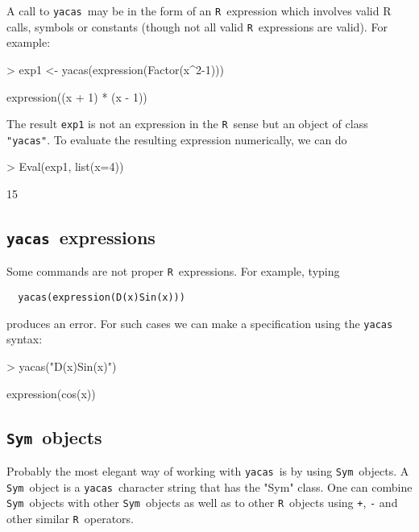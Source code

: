 \documentclass[]{article}
\newcommand{\yacas}{{\tt yacas}}
\newcommand{\code}[1]{{\tt #1}}
\def\R{\texttt{R}}
\def\sym{\texttt{Sym}}
\begin{document}
A call to \yacas\ may be in the form of an \R\ expression which
involves valid R calls, symbols or constants (though not all valid \R\
expressions are valid). For example:
\begin{Schunk}
\begin{Sinput}
> exp1 <- yacas(expression(Factor(x^2-1)))
\end{Sinput}
\begin{Soutput}
expression((x + 1) * (x - 1))
\end{Soutput}
\end{Schunk}

The result \code{exp1} is not an expression in the \R\ sense but an
object of class \code{"yacas"}. 
To evaluate the resulting expression numerically, we can do
\begin{Schunk}
\begin{Sinput}
> Eval(exp1, list(x=4))
\end{Sinput}
\begin{Soutput}
[1] 15
\end{Soutput}
\end{Schunk}

\subsection{\yacas\ expressions}

Some commands are not proper \R\ expressions. For example, 
typing 
\begin{verbatim}
  yacas(expression(D(x)Sin(x)))
\end{verbatim}
produces an error. 
For such cases we can make
a specification using the \yacas{} syntax:
\begin{Schunk}
\begin{Sinput}
> yacas("D(x)Sin(x)")
\end{Sinput}
\begin{Soutput}
expression(cos(x))
\end{Soutput}
\end{Schunk}


\subsection{\sym\ objects}

Probably the most elegant way of working with \yacas\ is by using
\sym\ objects.
A \sym\ object is a \yacas\ character string that has the "Sym" class.
One can combine \sym\ objects with other \sym\ objects as well as to
other \R\ objects using \code{+}, \code{-} and other similar \R\
operators.
\end{document}
